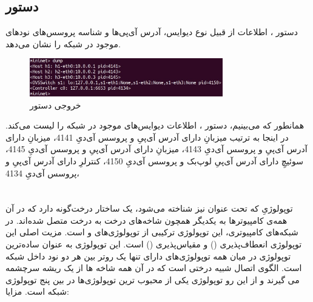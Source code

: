 \documentclass{article}
\begin{document}
\subsection{دستور }
دستور ، اطلاعات از قبیل نوع دیوایس، آدرس آی‌پی‌ها و شناسه پروسس‌های نودهای موجود در شبکه را نشان می‌دهد.
\begin{figure}[H]
    \centering
    \includegraphics[width=0.75\textwidth]{figures/2d.jpg}
    \caption
	{
خروجی دستور 
	}
    \label{fig:fig1}
\end{figure}
همانطور که می‌بینیم، دستور ، اطلاعات دیوایس‌های موجود در شبکه را لیست می‌کند. در اینجا به ترتیب 
میزبانِ  دارای آدرس آی‌پیِ  و پروسس آی‌دیِ 4141،
میزبانِ  دارای آدرس آی‌پیِ  و پروسس آی‌دیِ 4143،
میزبانِ  دارای آدرس آی‌پیِ  و پروسس آی‌دیِ 4145،
سوئیچِ  دارای آدرس آی‌پیِ لوپ‌بک  و پروسس آی‌دیِ 4150،
کنترلرِ  دارای آدرس آی‌پیِ  و پروسس آی‌دیِ 4134،

\section{}
\subsection{}
\subsubsection{}
توپولوژیِ  که تحت عنوان  نیز شناخته می‌شود، یک ساختار درخت‌گونه دارد که در آن همه‌ی کامپیوترها به یکدیگر همچون شاخه‌های درخت به درخت متصل شده‌اند. در شبکه‌های کامپیوتری، این توپولوژی ترکیبی از توپولوژی‌های  و  است. مزیت اصلی این توپولوژی انعطاف‌پذیری () و مقیاس‌پذیری () است. این توپولوژی به عنوان ساده‌ترین توپولوژی در میان همه توپولوژی‌های دارای تنها یک روتر بین هر دو نود داخل شبکه است. الگوی اتصال شبیه درختی است که در آن همه شاخه ها از یک ریشه سرچشمه می گیرند و از این رو توپولوژی  یکی از محبوب ترین توپولوژی‌ها در بین پنج توپولوژی شبکه است.
\newline
\newline
مزایا:
\end{document}
